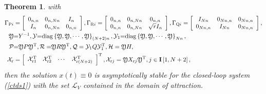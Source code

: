 \documentclass[9pt]{article}%
\newtheorem{theorem}{Theorem}
\begin{document}
\begin{theorem}
with%
\begin{align}
\Gamma_{\mathrm{P}i}  &  =\left[
\begin{array}
[c]{ccc}%
0_{n,n} & 0_{n,Nn} & I_{n}\\
I_{n} & 0_{n,Nn} & 0_{n,n}%
\end{array}
\right]  ,\Gamma_{\mathrm{R}i}=\left[
\begin{array}
[c]{ccc}%
0_{n,n} & 0_{n,Nn} & 0_{n,n}\\
0_{n,n} & 0_{n,Nn} & \sqrt{r}I_{n}%
\end{array}
\right]  ,\Gamma_{\mathrm{Q}i}=\left[
\begin{array}
[c]{ccc}%
I_{Nn} & 0_{Nn,n} & 0_{Nn,n}\\
0_{Nn,n} & I_{Nn} & 0_{Nn,n}%
\end{array}
\right]  ,\label{eq29}\\
\mathfrak{Y}  &  \mathfrak{=}Y^{-1},\mathcal{Y}\mathcal{=}\mathrm{diag}%
\left \{  \mathfrak{Y,Y,\cdots,Y}\right \}  _{\left(  N+2\right)  n}%
,\mathcal{Y}_{1}\mathcal{=}\mathrm{diag}\left \{  \mathfrak{Y,Y,\cdots
,Y}\right \}  _{Nn},\nonumber \\
\mathcal{P}  &  \mathcal{=}\mathfrak{Y}P\mathfrak{Y}^{\mathrm{T}}%
,\mathcal{R=}\mathfrak{Y}R\mathfrak{Y}^{\mathrm{T}},\mathcal{Q}=\mathcal{Y}%
_{1}Q\mathcal{Y}_{1}^{\mathrm{T}},\mathcal{H}=\mathfrak{Y}H,\nonumber \\
\mathcal{X}_{\mathrm{r}}  &  =\left[
\begin{array}
[c]{cccc}%
\mathcal{X}_{\mathrm{r1}}^{\mathrm{T}} & \mathcal{X}_{\mathrm{r2}}%
^{\mathrm{T}} & \cdots & \mathcal{X}_{\mathrm{r}\left(  N+2\right)
}^{\mathrm{T}}%
\end{array}
\right]  ^{\mathrm{T}},\mathcal{X}_{\mathrm{r}j}=\mathfrak{Y}X_{\mathrm{r}%
j}\mathfrak{Y}^{\mathrm{T}},j\in \mathbf{I}\left[  1,N+2\right]  ,\nonumber
\end{align}
then the solution $x\left(  t\right)  \equiv0$ is asymptotically stable for
the closed-loop system (\ref{ctds1}) with the set $\mathcal{L}_{V}$ contained
in the domain of attraction.
\end{theorem}
\end{document}
